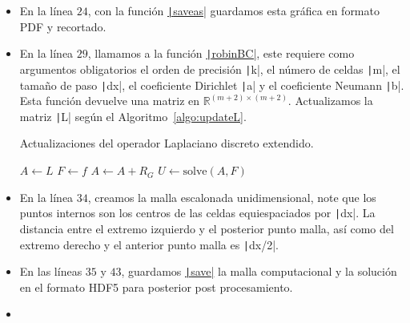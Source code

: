 \begin{itemize}
	\item

	      En la línea $24$, con la función
	      \href{https://docs.octave.org/latest/Printing-and-Saving-Plots.html}{\texttt|saveas|}
	      guardamos esta gráfica en formato PDF y recortado.

	\item

	      En la línea $29$, llamamos a la función
	      \href{https://carlosal1015.github.io/mole_examples/api_docs/matlab/src/matlab/robinBC.html}{\texttt|robinBC|},
	      este requiere como argumentos obligatorios el orden de
	      precisión \texttt|k|, el número  de celdas
	      \texttt|m|, el tamaño de paso
	      \texttt|dx|, el coeficiente Dirichlet
	      \texttt|a| y el coeficiente Neumann
	      \texttt|b|.
	      Esta función devuelve una matriz en
	      \begin{math}
		      \mathbb{R}^{\left(m+2\right)\times\left(m+2\right)}
	      \end{math}.
	      Actualizamos la matriz \texttt|L| según el
	      Algoritmo~\ref{algo:updateL}.

	      \begin{algorithm}[H]
		      \caption{Actualizaciones del operador Laplaciano discreto extendido.}\label{algo:updateL}
		      $A\leftarrow L$\;
		      $F\leftarrow f$\;
		      $A\leftarrow A+R_{G}$\;
		      $U\leftarrow \text{solve}\left(A, F\right)$\;
	      \end{algorithm}

	\item

	      En la línea $34$, creamos la malla escalonada
	      unidimensional, note que los puntos internos son los
	      centros de las celdas equiespaciados por
	      \texttt|dx|.
	      La distancia entre el extremo izquierdo y el posterior
	      punto malla, así como del extremo derecho y el anterior
	      punto malla es \texttt|dx/2|.

	\item

	      En las líneas $35$ y $43$, guardamos
	      \href{https://docs.octave.org/latest/Simple-File-I_002fO.html#index-save-6}{\texttt|save|}
	      la malla computacional y la solución en el formato HDF5
	      para posterior post procesamiento.

	\item


\end{itemize}
